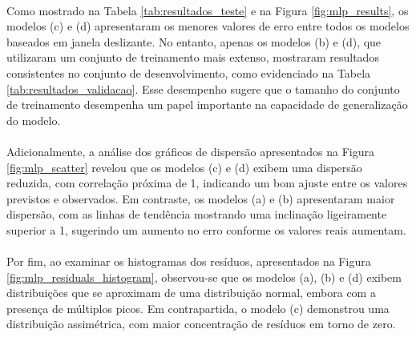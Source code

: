 \paragraph{} Como mostrado na Tabela \ref{tab:resultados_teste} e na Figura \ref{fig:mlp_results}, os modelos (c) e (d) apresentaram os menores valores de erro entre todos os modelos baseados em janela deslizante. No entanto, apenas os modelos (b) e (d), que utilizaram um conjunto de treinamento mais extenso, mostraram resultados consistentes no conjunto de desenvolvimento, como evidenciado na Tabela \ref{tab:resultados_validacao}. Esse desempenho sugere que o tamanho do conjunto de treinamento desempenha um papel importante na capacidade de generalização do modelo.
\paragraph{} Adicionalmente, a análise dos gráficos de dispersão apresentados na Figura \ref{fig:mlp_scatter} revelou que os modelos (c) e (d) exibem uma dispersão reduzida, com correlação próxima de 1, indicando um bom ajuste entre os valores previstos e observados. Em contraste, os modelos (a) e (b) apresentaram maior dispersão, com as linhas de tendência mostrando uma inclinação ligeiramente superior a 1, sugerindo um aumento no erro conforme os valores reais aumentam.
\paragraph{} Por fim, ao examinar os histogramas dos resíduos, apresentados na Figura \ref{fig:mlp_residuals_histogram}, observou-se que os modelos (a), (b) e (d) exibem distribuições que se aproximam de uma distribuição normal, embora com a presença de múltiplos picos. Em contrapartida, o modelo (c) demonstrou uma distribuição assimétrica, com maior concentração de resíduos em torno de zero.

